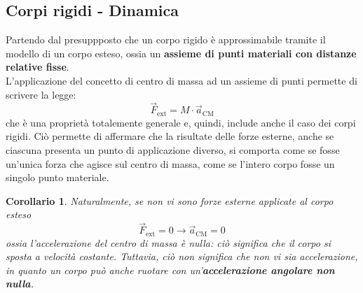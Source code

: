 \documentclass[a4paper]{extarticle}
\newtheorem{corollary}{Corollario}[theorem]
\begin{document}
\subsection{Corpi rigidi - Dinamica}
Partendo dal presuppposto che un corpo rigido è approssimabile tramite il modello di un corpo esteso, ossia un \textbf{assieme di punti materiali con distanze relative fisse}.\\
L'applicazione del concetto di centro di massa ad un assieme di punti permette di scrivere la legge:
\[\boxed{\vec F_{\text{ext}} = M \cdot \vec a_{\text{CM}}}\]
che è una proprietà totalemente generale e, quindi, include anche il caso dei corpi rigidi. Ciò permette di affermare che la risultate delle forze esterne, anche se ciascuna presenta un punto di applicazione diverso, si comporta come se fosse un'unica forza che agisce sul centro di massa, come se l'intero corpo fosse un singolo punto materiale.

\begin{corollary}
  Naturalmente, se non vi sono forze esterne applicate al corpo esteso
  \[\boxed{\vec F_{\text{ext}} = 0 \longrightarrow \vec a_{\text{CM}} = 0}\]
  ossia l'accelerazione del centro di massa è nulla: ciò significa che il corpo si sposta a velocità costante. Tuttavia, ciò non significa che non vi sia accelerazione, in quanto un corpo può anche ruotare con un'\textbf{accelerazione angolare non nulla}.
\end{corollary}

\vspace{1em}
\noindent
\end{document}
